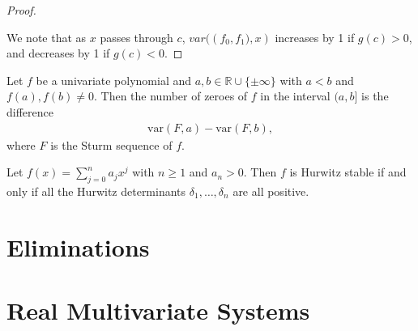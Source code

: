 \documentclass[12pt]{amsart}
\theoremstyle{definition}
\begin{document}
\begin{proof}
\begin{table}[h]
\begin{subtable}{.3\linewidth}
\end{subtable}%
\begin{subtable}{.3\linewidth}
\end{subtable}
\end{table}


We note that as $x$ passes through $c$, $var(\left(f_{0},f_{1}),x\right)$ increases by 1 if $g(c)>0$, and decreases by 1 if $g(c)<0$.


\end{proof}

\theorem[Sturm]
Let $f$ be a univariate polynomial and $a,b\in \mathbb{R}\cup\{\pm\infty\}$ with $a<b$ and $f(a),f(b)\neq 0$. Then the number of zeroes of $f$ in the interval $(a,b]$ is the difference 
\begin{align*}
\text{var}(F,a) - \text{var}(F,b),
\end{align*}
where $F$ is the Sturm sequence of $f$.

\theorem
Let $f(x) = \sum_{j=0}^{n}a_{j}x^{j}$ with $n\geq 1$ and $a_{n}>0$. Then $f$ is Hurwitz stable if and only if all the Hurwitz determinants $\delta_{1},\dots,\delta_{n}$ are all positive.
%
%

\section{Eliminations}
%


\section{Real Multivariate Systems}
%



%

\end{document}
